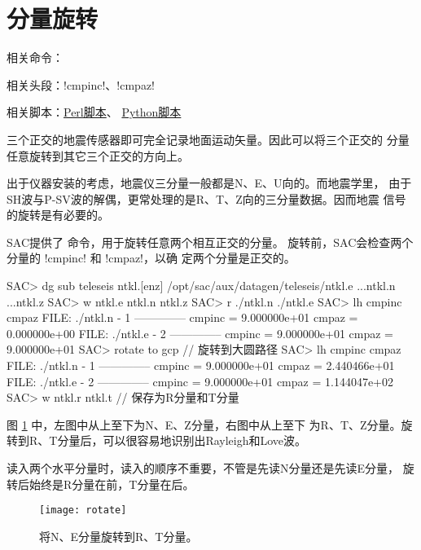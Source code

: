 \section{分量旋转}
\label{sec:traces-rotating}
相关命令：

相关头段：!cmpinc!、!cmpaz!

相关脚本：\hyperref[subsec:rotate-perl]{Perl脚本}、
          \hyperref[subsec:rotate-python]{Python脚本}

三个正交的地震传感器即可完全记录地面运动矢量。因此可以将三个正交的
分量任意旋转到其它三个正交的方向上。

出于仪器安装的考虑，地震仪三分量一般都是N、E、U向的。而地震学里，
由于SH波与P-SV波的解偶，更常处理的是R、T、Z向的三分量数据。因而地震
信号的旋转是有必要的。

SAC提供了  命令，用于旋转任意两个相互正交的分量。
旋转前，SAC会检查两个分量的 !cmpinc! 和 !cmpaz!，以确
定两个分量是正交的。

\begin{SACCode}
SAC> dg sub teleseis ntkl.[enz]
/opt/sac/aux/datagen/teleseis/ntkl.e ...ntkl.n ...ntkl.z
SAC> w ntkl.e ntkl.n ntkl.z
SAC> r ./ntkl.n ./ntkl.e
SAC> lh cmpinc cmpaz
  FILE: ./ntkl.n - 1
 --------------
     cmpinc = 9.000000e+01
      cmpaz = 0.000000e+00
  FILE: ./ntkl.e - 2
 --------------
     cmpinc = 9.000000e+01
      cmpaz = 9.000000e+01
SAC> rotate to gcp              // 旋转到大圆路径
SAC> lh cmpinc cmpaz
  FILE: ./ntkl.n - 1
 --------------
     cmpinc = 9.000000e+01
      cmpaz = 2.440466e+01
  FILE: ./ntkl.e - 2
 --------------
     cmpinc = 9.000000e+01
      cmpaz = 1.144047e+02
SAC> w ntkl.r ntkl.t            // 保存为R分量和T分量
\end{SACCode}

图 \ref{fig:rotate} 中，左图中从上至下为N、E、Z分量，右图中从上至下
为R、T、Z分量。旋转到R、T分量后，可以很容易地识别出Rayleigh和Love波。

\begin{note}
读入两个水平分量时，读入的顺序不重要，不管是先读N分量还是先读E分量，
旋转后始终是R分量在前，T分量在后。
\end{note}

\begin{figure}[H]
\centering
\texttt{[image: rotate]}
\caption[水平分量旋转]{将N、E分量旋转到R、T分量。}
\label{fig:rotate}
\end{figure}
